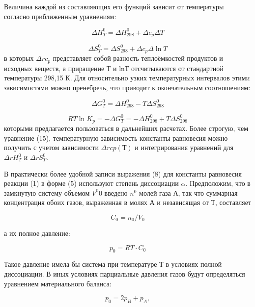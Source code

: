 \documentclass[a4paper,12pt]{article} %
\begin{document}
Величина каждой из составляющих его функций зависит от температуры согласно приближенным уравнениям:

\begin{equation}
 \Delta H_T^0 = \Delta H_{298}^0 + \Delta c_p \Delta T
\end{equation}

\begin{equation}
 \Delta S_T^0 = \Delta S_{298}^0 + \Delta c_p \Delta \ln{T}
\end{equation}
в которых \(\Delta r c_p\) представляет собой разность теплоёмкостей продуктов и исходных веществ, а приращение Т и lnТ отсчитываются от стандартной температуры 298,15 К. Для относительно узких температурных интервалов этими зависимостями можно пренебречь, что приводит к окончательным соотношениям:

\begin{equation}
 \Delta G_T^0 = \Delta H_{298}^0 - T \Delta S_{298}^0
\end{equation}

\begin{equation}
 RT \ln K_p = - \Delta G_T^0 = -\Delta H_{298}^0 + T \Delta S_{298}^0
\end{equation}
которыми предлагается пользоваться в дальнейших расчетах. Более строгую, чем уравнение (15), температурную зависимость константы равновесия можно получить с учетом зависимости \(\Delta rcp(Т)\) и интегрирования уравнений для $\Delta rH_T^0$ и $\Delta rS_T^0$.
	
В практически более удобной записи выражения (8) для константы равновесия реакции (1) в форме (5) используют степень диссоциации \(\alpha\). Предположим, что в замкнутую систему объемом \(V^0\)0 введено \(n^0\) молей газа А, так что суммарная концентрация обоих газов, выраженная в молях А и независящая от Т, составляет

\begin{equation}
 C_0 = n_0 /V_0
\end{equation}

а их полное давление:

\begin{equation}
 p_0 = RT \cdot C_0
\end{equation}

Такое давление имела бы система при температуре Т в условиях полной диссоциации. В иных условиях парциальные давления газов будут определяться уравнением материального баланса:

\begin{equation}
 p_0 = 2p_B + p_A,
\end{equation}
\end{document}
